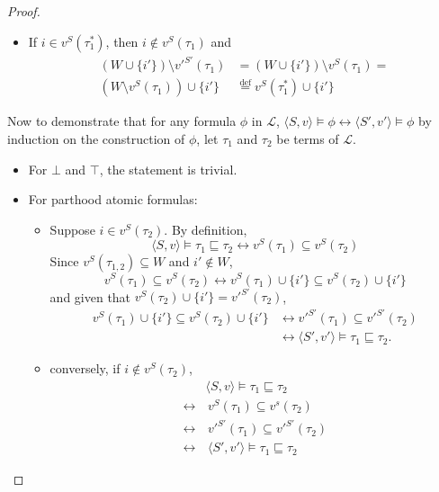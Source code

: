 \documentclass{article}
\newcommand{\lang}{\mathcal{L}}
\newcommand{\lstar}{^*}
\newcommand{\lpart}{\sqsubseteq}
\newcommand{\eqdef}{\stackrel{\text{def}}{=}}
\begin{document}
\begin{proof}
\begin{itemize}
\begin{itemize}
\begin{itemize}
      \item If $i \in v^S(\tau_1\lstar)$, then $i \not \in v^S(\tau_1)$ and
        \begin{align*}
          (W \cup \{i'\}) \setminus v'^{S'}(\tau_1) &= (W \cup \{i'\}) \setminus v^S(\tau_1) = \\
          (W \setminus v^S(\tau_1)) \cup \{i'\} &\eqdef v^S(\tau_1\lstar) \cup \{i'\}
        \end{align*}
      \end{itemize}

    \end{itemize}
\end{itemize}
Now to demonstrate that for any formula $\phi$ in $\lang$, $\langle S, v \rangle \models \phi \longleftrightarrow \langle S', v' \rangle \models \phi$ by induction on the construction of $\phi$, let $\tau_1$ and $\tau_2$ be terms of $\lang$.
\begin{itemize}
  \item For $\bot$ and $\top$, the statement is trivial.
  \item For parthood atomic formulas:
    \begin{itemize}
    \item Suppose $i \in v^S(\tau_2)$. By definition,
      \begin{equation*}
        \langle S, v \rangle \models \tau_1 \lpart \tau_2 \longleftrightarrow v^S(\tau_1) \subseteq v^S(\tau_2)
      \end{equation*}
      Since $v^S(\tau_{1,2}) \subseteq W$ and $i' \not \in W$,
      \begin{equation*}
         v^S(\tau_1) \subseteq v^S(\tau_2) \longleftrightarrow v^S(\tau_1) \cup \{i'\} \subseteq v^S(\tau_2) \cup \{i'\}
      \end{equation*}
      and given that $v^S(\tau_2) \cup \{i'\} = v'^{S'}(\tau_2)$,
      \begin{align*}
        v^S(\tau_1) \cup \{i'\} \subseteq v^S(\tau_2) \cup \{i'\} &\longleftrightarrow v'^{S'}(\tau_1) \subseteq v'^{S'}(\tau_2) \\
        &\longleftrightarrow \langle S', v' \rangle \models \tau_1 \lpart \tau_2.
      \end{align*}
    \item conversely, if $i \not \in v^S(\tau_2)$,
      \begin{align*}
        &\langle S, v \rangle \models \tau_1 \lpart \tau_2 \\
        \longleftrightarrow&\, v^S(\tau_1) \subseteq v^s(\tau_2) \\
        \longleftrightarrow&\, v'^{S'}(\tau_1) \subseteq v'^{S'}(\tau_2) \\
        \longleftrightarrow&\, \langle S', v' \rangle \models \tau_1 \lpart \tau_2
      \end{align*}


\end{itemize}
\end{itemize}
\end{proof}
\end{document}
